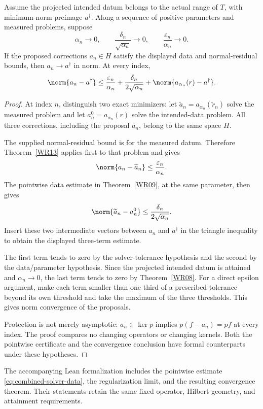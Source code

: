 \begin{theorem}\label{WR16}
Assume the projected intended datum belongs to the actual range of $T$, with minimum-norm preimage $a^\dagger$. Along a sequence of positive parameters and measured problems, suppose
\[
 \alpha_n\to0,\qquad
 \frac{\delta_n}{\sqrt{\alpha_n}}\to0,\qquad
 \frac{\varepsilon_n}{\alpha_n}\to0.
\]
If the proposed corrections $a_n\in H$ satisfy the displayed data and normal-residual bounds, then $a_n\to a^\dagger$ in norm. At every index,
\[
 \norm{a_n-a^\dagger}
 \le\frac{\varepsilon_n}{\alpha_n}
      +\frac{\delta_n}{2\sqrt{\alpha_n}}
      +\norm{a_{\alpha_n}(r)-a^\dagger}.
\]
\end{theorem}
\begin{proof}
At index $n$, distinguish two exact minimizers: let $\widetilde a_n=a_{\alpha_n}(\widetilde r_n)$ solve the measured problem and let $a_n^0=a_{\alpha_n}(r)$ solve the intended-data problem. All three corrections, including the proposal $a_n$, belong to the same space $H$.

The supplied normal-residual bound is for the measured datum. Therefore Theorem~\ref{WR13} applies first to that problem and gives
\[
 \norm{a_n-\widetilde a_n}\le\frac{\varepsilon_n}{\alpha_n}.
\]
The pointwise data estimate in Theorem~\ref{WR09}, at the same parameter, then gives
\[
 \norm{\widetilde a_n-a_n^0}\le\frac{\delta_n}{2\sqrt{\alpha_n}}.
\]
Insert these two intermediate vectors between $a_n$ and $a^\dagger$ in the triangle inequality to obtain the displayed three-term estimate.

The first term tends to zero by the solver-tolerance hypothesis and the second by the data/parameter hypothesis. Since the projected intended datum is attained and $\alpha_n\to0$, the last term tends to zero by Theorem~\ref{WR08}. For a direct epsilon argument, make each term smaller than one third of a prescribed tolerance beyond its own threshold and take the maximum of the three thresholds. This gives norm convergence of the proposals.

Protection is not merely asymptotic: $a_n\in\ker p$ implies $p(f-a_n)=pf$ at every index. The proof compares no changing operators or changing kernels. Both the pointwise certificate and the convergence conclusion have formal counterparts under these hypotheses.
\end{proof}

The accompanying Lean formalization includes the pointwise estimate \eqref{eq:combined-solver-data}, the regularization limit, and the resulting convergence theorem. Their statements retain the same fixed operator, Hilbert geometry, and attainment requirements.

